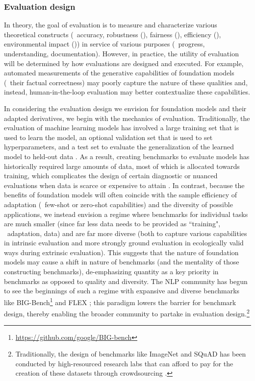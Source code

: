 \subsubsection{Evaluation design}
\label{sec:evaluation-design}

In theory, the goal of evaluation is to measure and characterize various theoretical constructs (\eg~accuracy, robustness (), fairness (), efficiency (), environmental impact ()) in service of various purposes (\ie~progress, understanding, documentation).
However, in practice, the utility of evaluation will be determined by how evaluations are designed and executed.
For example, automated measurements of the generative capabilities of foundation models (\eg~their factual correctness) may poorly capture the nature of these qualities and, instead, human-in-the-loop evaluation may better contextualize these capabilities. 

In considering the evaluation design we envision for foundation models and their adapted derivatives, we begin with the mechanics of evaluation.
Traditionally, the evaluation of machine learning models has involved a large training set that is used to learn the model, an optional validation set that is used to set hyperparameters, and a test set to evaluate the generalization of the learned model to held-out data \citep{bishop2006}.
As a result, creating benchmarks to evaluate models has historically required large amounts of data, most of which is allocated towards training, which complicates the design of certain diagnostic or nuanced evaluations when data is scarce or expensive to attain \citep{rogers2020, rogers2021}. 
In contrast, because the benefits of foundation models will often coincide with the sample efficiency of adaptation (\ie~few-shot or zero-shot capabilities) and the diversity of possible applications, we instead envision a regime where benchmarks for individual tasks are much smaller (since far less data needs to be provided as ``training", \ie~adaptation, data) and are far more diverse (both to capture various capabilities in intrinsic evaluation and more strongly ground evaluation in ecologically valid ways \citep{brofenbrenner1977, vries2020} during extrinsic evaluation).
This suggests that the nature of foundation models may cause a shift in nature of benchmarks (and the mentality of those constructing benchmarks), de-emphasizing quantity as a key priority in benchmarks as opposed to quality and diversity.
The NLP community has begun to see the beginnings of such a regime with expansive and diverse benchmarks like BIG-Bench\footnote{\url{https://github.com/google/BIG-bench}} and FLEX \citep{bragg2021}; this paradigm lowers the barrier for benchmark design, thereby enabling the broader community to partake in evaluation design.\footnote{Traditionally, the design of benchmarks like ImageNet \citep{deng2009imagenet} and SQuAD \citep{rajpurkar2016squad} has been conducted by high-resourced research labs that can afford to pay for the creation of these datasets through crowdsourcing \citep{rogers2020}.} 

